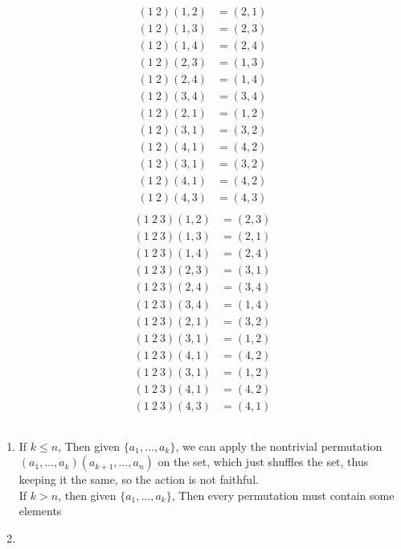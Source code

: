 \documentclass{article}
\newcommand{\set}[1]{ \{ #1 \} }
\begin{document}
\subsubsection{}\label{ex7p9}
\begin{align*}
(1\ 2)(1,2) &= (2,1)\\
(1\ 2)(1,3) &= (2,3)\\
(1\ 2)(1,4) &= (2,4)\\
(1\ 2)(2,3) &= (1,3)\\
(1\ 2)(2,4) &= (1,4)\\
(1\ 2)(3,4) &= (3,4)\\
(1\ 2)(2,1) &= (1,2)\\
(1\ 2)(3,1) &= (3,2)\\
(1\ 2)(4,1) &= (4,2)\\
(1\ 2)(3,1) &= (3,2)\\
(1\ 2)(4,1) &= (4,2)\\
(1\ 2)(4,3) &= (4,3)\\
\end{align*}
\begin{align*}
(1\ 2\ 3)(1,2) &= (2,3)\\
(1\ 2\ 3)(1,3) &= (2,1)\\
(1\ 2\ 3)(1,4) &= (2,4)\\
(1\ 2\ 3)(2,3) &= (3,1)\\
(1\ 2\ 3)(2,4) &= (3,4)\\
(1\ 2\ 3)(3,4) &= (1,4)\\
(1\ 2\ 3)(2,1) &= (3,2)\\
(1\ 2\ 3)(3,1) &= (1,2)\\
(1\ 2\ 3)(4,1) &= (4,2)\\
(1\ 2\ 3)(3,1) &= (1,2)\\
(1\ 2\ 3)(4,1) &= (4,2)\\
(1\ 2\ 3)(4,3) &= (4,1)\\
\end{align*}
\subsubsection{}\label{ex7p10}
\begin{enumerate}
\item If $k \leq n$, Then given $\set{a_1,\ldots,a_k}$, we can apply the nontrivial permutation $(a_1,\ldots,a_k)(a_{k+1},\ldots,a_n)$ on the set, which just shuffles the set, thus keeping it the same, so the action is not faithful.\\
If $k>n$, then given $\set{a_1,\ldots, a_k}$, Then every permutation must contain some elements 
\item
\end{enumerate}
\end{document}
